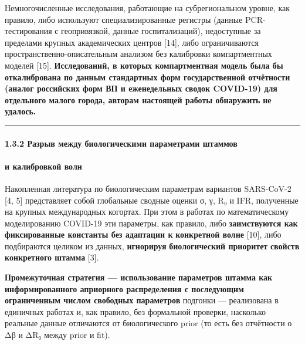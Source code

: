 \documentclass[12pt]{article}
\begin{document}
Немногочисленные исследования, работающие на субрегиональном уровне, как
правило, либо используют специализированные регистры (данные
PCR-тестирования с геопривязкой, данные госпитализаций), недоступные за
пределами крупных академических центров {[}14{]}, либо ограничиваются
пространственно-описательным анализом без калибровки компартментных
моделей {[}15{]}. \textbf{Исследований, в которых компартментная модель
была бы} \textbf{откалибрована по данным стандартных форм
государственной отчётности} \textbf{(аналог российских форм ВП и
еженедельных сводок COVID-19) для} \textbf{отдельного малого города,
авторам настоящей работы обнаружить} \textbf{не удалось.}

\begin{center}\rule{0.5\linewidth}{0.5pt}\end{center}

\paragraph{1.3.2 Разрыв между биологическими параметрами
штаммов}\label{ux440ux430ux437ux440ux44bux432-ux43cux435ux436ux434ux443-ux431ux438ux43eux43bux43eux433ux438ux447ux435ux441ux43aux438ux43cux438-ux43fux430ux440ux430ux43cux435ux442ux440ux430ux43cux438-ux448ux442ux430ux43cux43cux43eux432}

\paragraph{и калибровкой
волн}\label{ux438-ux43aux430ux43bux438ux431ux440ux43eux432ux43aux43eux439-ux432ux43eux43bux43d}

Накопленная литература по биологическим параметрам вариантов SARS-CoV-2
{[}4, 5{]} представляет собой глобальные сводные оценки σ, γ, R₀ и IFR,
полученные на крупных международных когортах. При этом в работах по
математическому моделированию COVID-19 эти параметры, как правило, либо
\textbf{заимствуются как фиксированные константы без адаптации к}
\textbf{конкретной волне} {[}10{]}, либо подбираются целиком из данных,
\textbf{игнорируя} \textbf{биологический приоритет} \textbf{свойств
конкретного штамма} {[}3{]}.

\textbf{Промежуточная стратегия --- использование параметров штамма как
информированного априорного распределения с последующим ограниченным
числом свободных параметров} подгонки --- реализована в единичных
работах и, как правило, без формальной проверки, насколько реальные
данные отличаются от биологического prior (то есть без отчётности о Δβ и
ΔR₀ между prior и fit).
\end{document}
